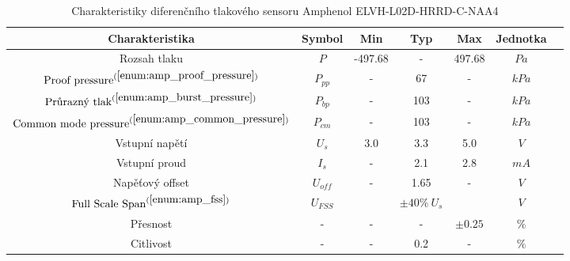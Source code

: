 \begin{table}[H]
    \label{tab:amphenol_properies}
    \caption{Charakteristiky diferenčního tlakového sensoru Amphenol ELVH-L02D-HRRD-C-NAA4 \cite{cite:Allsensors}}
    \centering
    \begin{ctucolortab}
        \begin{tabular}{ccccccc}
            \toprule
            Charakteristika                                                         & Symbol    & Min     & Typ               & Max         & Jednotka & \\ \midrule
            Rozsah tlaku                                                            & $P$       & -497.68 & -                 & 497.68      & $Pa$     & \\
            $\textnormal{Proof pressure}^{(\ref{enum:amp_proof_pressure})}$         & $P_{pp}$  & -       & 67                & -           & $kPa$    & \\
            $\textnormal{Průrazný tlak}^{(\ref{enum:amp_burst_pressure}) }$         & $P_{bp}$  & -       & 103               & -           & $kPa$    & \\
            $\textnormal{Common mode pressure}^{(\ref{enum:amp_common_pressure})} $ & $P_{cm}$  & -       & 103               & -           & $kPa$    & \\
            Vstupní napětí                                                          & $U_{s}$   & 3.0     & 3.3               & 5.0         & $V$      & \\
            Vstupní proud                                                           & $I_{s}$   & -       & 2.1               & 2.8         & $mA$     & \\
            Napěťový offset                                                         & $U_{off}$ & -       & 1.65              & -           & $V$      & \\
            $\textnormal{Full Scale Span}^{(\ref{enum:amp_fss})} $                  & $U_{FSS}$ &         & $\pm 40 \% \ U_s$ &             & $V$      & \\
            Přesnost                                                                & -         & -       & -                 & $\pm 0.25 $ & $\%$     & \\
            Citlivost                                                               & -         & -       & 0.2               & -           & $\%$     & \\
            \bottomrule
        \end{tabular}

\end{ctucolortab}
\end{table}
